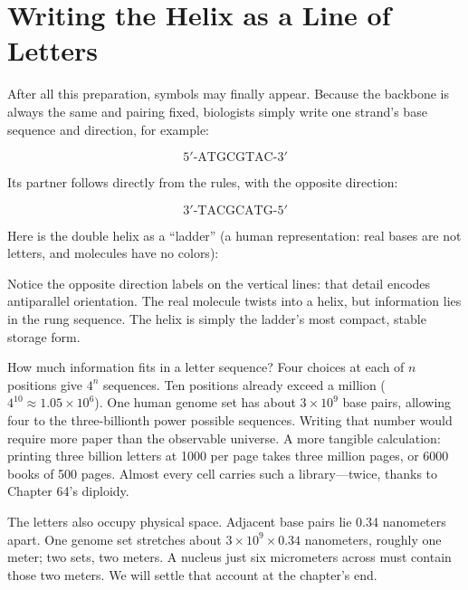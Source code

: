 \section{Writing the Helix as a Line of Letters}

After all this preparation, symbols may finally appear. Because the backbone is always the same and pairing fixed, biologists simply write one strand's base sequence and direction, for example:

\[5'\text{-ATGCGTAC-}3'\]

Its partner follows directly from the rules, with the opposite direction:

\[3'\text{-TACGCATG-}5'\]

Here is the double helix as a ``ladder'' (a human representation: real bases are not letters, and molecules have no colors):

\begin{center}
\end{center}

Notice the opposite direction labels on the vertical lines: that detail encodes antiparallel orientation. The real molecule twists into a helix, but information lies in the rung sequence. The helix is simply the ladder's most compact, stable storage form.

How much information fits in a letter sequence? Four choices at each of $n$ positions give $4^n$ sequences. Ten positions already exceed a million ($4^{10}\approx 1.05\times 10^{6}$). One human genome set has about $3\times 10^{9}$ base pairs, allowing four to the three-billionth power possible sequences. Writing that number would require more paper than the observable universe. A more tangible calculation: printing three billion letters at 1000 per page takes three million pages, or 6000 books of 500 pages. Almost every cell carries such a library---twice, thanks to Chapter 64's diploidy.

The letters also occupy physical space. Adjacent base pairs lie 0.34 nanometers apart. One genome set stretches about $3\times 10^{9}\times 0.34$ nanometers, roughly one meter; two sets, two meters. A nucleus just six micrometers across must contain those two meters. We will settle that account at the chapter's end.

